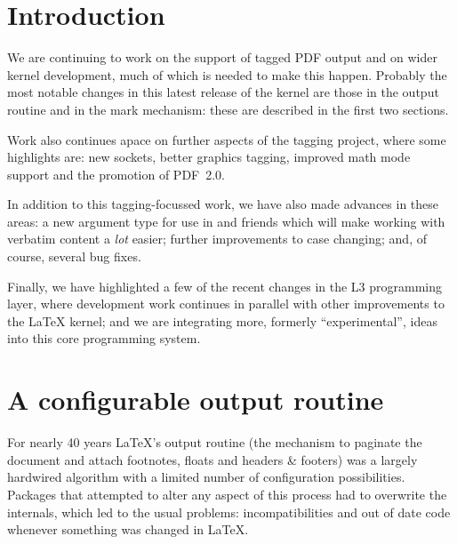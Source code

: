 \documentclass{ltnews}
\begin{document}
\maketitle
{  \spaceskip=3.33pt 
 \small
\tableofcontents}

\setlength{}

\medskip

\section{Introduction}

We are continuing to work on the support of tagged PDF output and on
wider kernel development, much of which is needed to make this
happen.  Probably the most notable changes in this latest release of
the kernel are those in the output routine and in the mark mechanism:
these are described in the first two sections.

Work also continues apace on further aspects of the tagging project,
where some highlights are: new sockets, better graphics tagging,
improved math mode support and the promotion of PDF~2.0.

In addition to this tagging-focussed work, we have also made advances
in these areas: a new argument type for use in
 and friends which will make working with
verbatim content a \emph{lot} easier; further improvements to case
changing; and, of course, several bug fixes.

Finally, we have highlighted a few of the recent changes in the L3
programming layer, where development work continues in parallel with
other improvements to the \LaTeX{} kernel; and we are integrating
more, formerly \enquote{experimental}, ideas into this core
programming system.



\section{A configurable output routine}

For nearly 40 years \LaTeX's output routine (the mechanism to paginate
the document and attach footnotes, floats and headers \& footers) was
a largely hardwired algorithm with a limited number of configuration
possibilities.  Packages that attempted to alter any aspect of this
process had to overwrite the internals, which led to the usual
problems: incompatibilities and out of date code whenever something
was changed in \LaTeX{}.
\end{document}
